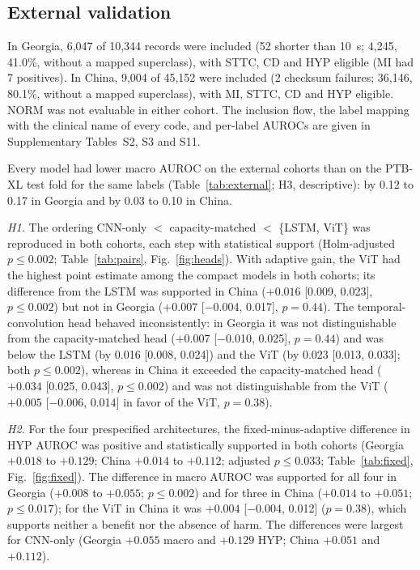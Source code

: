 \documentclass{wlscirep}
\begin{document}
\subsection*{External validation}
In Georgia, 6{,}047 of 10{,}344 records were included (52 shorter than 10~s; 4{,}245, 41.0\%, without a mapped superclass), with STTC, CD and HYP eligible (MI had 7 positives). In China, 9{,}004 of 45{,}152 were included (2 checksum failures; 36{,}146, 80.1\%, without a mapped superclass), with MI, STTC, CD and HYP eligible. NORM was not evaluable in either cohort. The inclusion flow, the label mapping with the clinical name of every code, and per-label AUROCs are given in Supplementary Tables~S2, S3 and S11.

Every model had lower macro AUROC on the external cohorts than on the PTB-XL test fold for the same labels (Table~\ref{tab:external}; H3, descriptive): by 0.12 to 0.17 in Georgia and by 0.03 to 0.10 in China.

\emph{H1.} The ordering CNN-only $<$ capacity-matched $<$ \{LSTM, ViT\} was reproduced in both cohorts, each step with statistical support (Holm-adjusted $p\le0.002$; Table~\ref{tab:pairs}, Fig.~\ref{fig:heads}). With adaptive gain, the ViT had the highest point estimate among the compact models in both cohorts; its difference from the LSTM was supported in China ($+0.016$ [0.009, 0.023], $p\le0.002$) but not in Georgia ($+0.007$ [$-$0.004, 0.017], $p=0.44$). The temporal-convolution head behaved inconsistently: in Georgia it was not distinguishable from the capacity-matched head ($+0.007$ [$-$0.010, 0.025], $p=0.44$) and was below the LSTM (by 0.016 [0.008, 0.024]) and the ViT (by 0.023 [0.013, 0.033]; both $p\le0.002$), whereas in China it exceeded the capacity-matched head ($+0.034$ [0.025, 0.043], $p\le0.002$) and was not distinguishable from the ViT ($+0.005$ [$-$0.006, 0.014] in favor of the ViT, $p=0.38$).

\emph{H2.} For the four prespecified architectures, the fixed-minus-adaptive difference in HYP AUROC was positive and statistically supported in both cohorts (Georgia $+0.018$ to $+0.129$; China $+0.014$ to $+0.112$; adjusted $p\le0.033$; Table~\ref{tab:fixed}, Fig.~\ref{fig:fixed}). The difference in macro AUROC was supported for all four in Georgia ($+0.008$ to $+0.055$; $p\le0.002$) and for three in China ($+0.014$ to $+0.051$; $p\le0.017$); for the ViT in China it was $+0.004$ [$-$0.004, 0.012] ($p=0.38$), which supports neither a benefit nor the absence of harm. The differences were largest for CNN-only (Georgia $+0.055$ macro and $+0.129$ HYP; China $+0.051$ and $+0.112$).
\end{document}
